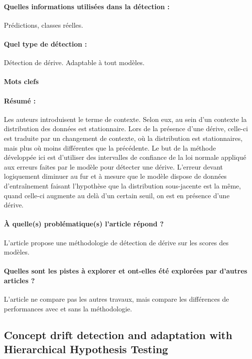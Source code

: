 \documentclass[11pt,a4paper]{report}
\begin{document}
\paragraph{Quelles informations utilisées dans la détection :} Prédictions, classes réelles.
\paragraph{Quel type de détection :} Détection de dérive. Adaptable à tout modèles.

\paragraph{Mots clefs}

\paragraph{Résumé :} Les auteurs introduisent le terme de contexte. Selon eux, au sein d'un contexte la distribution des données est stationnaire. Lors de la présence d'une dérive, celle-ci est traduite par un changement de contexte, où la distribution est stationnaires, mais plus où moins différentes que la précédente. Le but de la méthode développée ici est d'utiliser des intervalles de confiance de la loi normale appliqué aux erreurs faites par le modèle pour détecter une dérive. L'erreur devant logiquement diminuer au fur et à mesure que le modèle dispose de données d'entraînement faisant l'hypothèse que la distribution sous-jacente est la même, quand celle-ci augmente au delà d'un certain seuil, on est en présence d'une dérive.

\paragraph{À quelle(s) problématique(s) l'article répond ?} L'article propose une méthodologie de détection de dérive sur les scores des modèles.

\paragraph{Quelles sont les pistes à explorer et ont-elles  été explorées par d'autres articles ?} L'article ne compare pas les autres travaux, mais compare les différences de performances avec et sans la méthodologie.







\subsection{Concept drift detection and adaptation with Hierarchical Hypothesis Testing}
\end{document}
